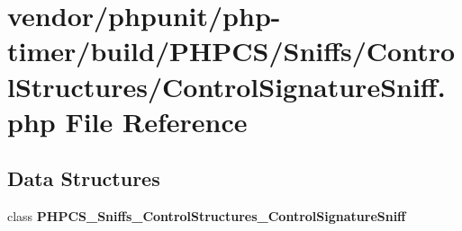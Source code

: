 \section{vendor/phpunit/php-\/timer/build/\+P\+H\+P\+C\+S/\+Sniffs/\+Control\+Structures/\+Control\+Signature\+Sniff.php File Reference}
\label{php-timer_2build_2_p_h_p_c_s_2_sniffs_2_control_structures_2_control_signature_sniff_8php}
\subsection*{Data Structures}
\begin{DoxyCompactItemize}
\item 
class {\bf P\+H\+P\+C\+S\+\_\+\+Sniffs\+\_\+\+Control\+Structures\+\_\+\+Control\+Signature\+Sniff}
\end{DoxyCompactItemize}
